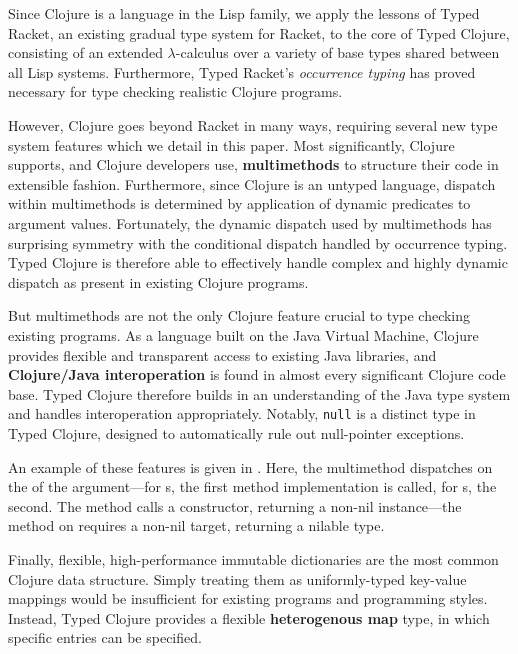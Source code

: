 Since Clojure is a language in the
Lisp family, we apply the lessons of Typed Racket, an existing gradual type
system for Racket, to the core of Typed Clojure, consisting of an extended
$\lambda$-calculus over a variety of base types shared between all Lisp systems.
%
Furthermore, Typed Racket's \emph{occurrence typing} has proved
necessary for type checking realistic Clojure programs.

However, Clojure goes beyond Racket in many ways, requiring several
new type system features which we detail in this paper.
%
Most significantly, Clojure supports, and Clojure developers use,
\textbf{multimethods} to structure their code in extensible
fashion. Furthermore, since Clojure is an untyped language, dispatch
within multimethods is determined by application of dynamic predicates
to argument values. 
%
Fortunately, the dynamic dispatch used by multimethods has surprising
symmetry with the conditional dispatch handled by occurrence
typing. Typed Clojure is therefore able to effectively handle complex
and highly dynamic dispatch as present in existing Clojure programs. 

But multimethods are not the only Clojure feature crucial to type
checking existing programs. As a language built on the Java Virtual
Machine, Clojure provides flexible and transparent access to existing
Java libraries, and \textbf{Clojure/Java interoperation} is found in almost
every significant Clojure code base. Typed Clojure therefore builds in
an understanding of the Java type system and handles interoperation
appropriately. Notably, \texttt{null} is a distinct type in Typed Clojure,
designed to automatically rule out null-pointer exceptions.

An example of these features is given in
. Here, the  multimethod dispatches
on the  of the argument---for s,
the first method implementation is called, for s, the
second. The  method calls
a  constructor, returning a non-nil  instance---the 
 method 
on  requires a non-nil target, returning a nilable
type.  

Finally, flexible, high-performance immutable dictionaries
are the most common Clojure data structure.
Simply treating them as uniformly-typed
key-value mappings would be insufficient for existing
programs and programming styles. Instead, Typed Clojure provides a
flexible \textbf{heterogenous map} type, in which specific entries can be specified. 

